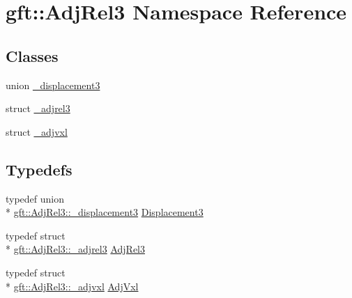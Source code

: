 \hypertarget{namespacegft_1_1AdjRel3}{\section{gft\-:\-:Adj\-Rel3 Namespace Reference}
\label{namespacegft_1_1AdjRel3}
}
\subsection*{Classes}
\begin{DoxyCompactItemize}
\item 
union \hyperlink{uniongft_1_1AdjRel3_1_1__displacement3}{\-\_\-displacement3}
\item 
struct \hyperlink{structgft_1_1AdjRel3_1_1__adjrel3}{\-\_\-adjrel3}
\item 
struct \hyperlink{structgft_1_1AdjRel3_1_1__adjvxl}{\-\_\-adjvxl}
\end{DoxyCompactItemize}
\subsection*{Typedefs}
\begin{DoxyCompactItemize}
\item 
typedef union \\*
\hyperlink{uniongft_1_1AdjRel3_1_1__displacement3}{gft\-::\-Adj\-Rel3\-::\-\_\-displacement3} \hyperlink{namespacegft_1_1AdjRel3_a8939e0d3e5e0afd8c4e28e4b400de74e}{Displacement3}
\item 
typedef struct \\*
\hyperlink{structgft_1_1AdjRel3_1_1__adjrel3}{gft\-::\-Adj\-Rel3\-::\-\_\-adjrel3} \hyperlink{namespacegft_1_1AdjRel3_a0d54e2f148bf5636f3a3faf70d4eb5ae}{Adj\-Rel3}
\item 
typedef struct \\*
\hyperlink{structgft_1_1AdjRel3_1_1__adjvxl}{gft\-::\-Adj\-Rel3\-::\-\_\-adjvxl} \hyperlink{namespacegft_1_1AdjRel3_af816b2f50a2bbe691cddc961d58b16da}{Adj\-Vxl}
\end{DoxyCompactItemize}
